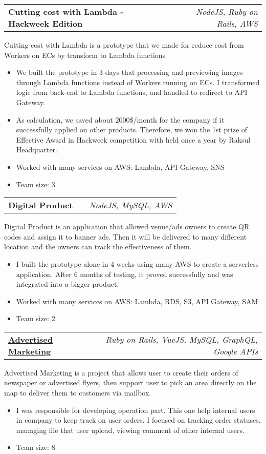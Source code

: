 \documentclass[a4paper,11pt]{article}
\makeatletter
\newcommand{\resumeItem}[1]{
  \item\small{#1}
}
\newcommand{\resumeItemListStart}{\begin{itemize}[rightmargin=0.11in]}
\newcommand{\resumeItemListEnd}{\end{itemize}}
\newcommand{\resumeTrioHeading}[3]{
  \item\small{
    \begin{tabular*}{0.96\textwidth}[t]{
      l@{\extracolsep{\fill}}c@{\extracolsep{\fill}}r
    }
      \textbf{#1} & \textit{#2} & \textit{#3}
      \smallskip
    \end{tabular*}
  }
}
\makeatother
\begin{document}
      \resumeTrioHeading{Cutting cost with Lambda - Hackweek Edition}{}{NodeJS, Ruby on Rails, AWS}
      \small{Cutting cost with Lambda is a prototype that we made for reduce cost from Workers on ECs by transform to Lambda functions}
        \resumeItemListStart{}    
          \resumeItem{We built the prototype in 3 days that processing and previewing images through Lambda functions instead of Workers running on ECs. I transformed logic from back-end to Lambda functions, and handled to redirect to API Gateway. }
          \resumeItem{As calculation, we saved about 2000\$/month for the company if it successfully applied on other products. Therefore, we won the 1st prize of Effective Award in Hackweek competition with held once a year by Raksul Headquarter.}
          \resumeItem{Worked with many services on AWS: Lambda, API Gateway, SNS}
          \resumeItem{Team size: 3}
        \resumeItemListEnd{}

      \resumeTrioHeading{Digital Product}{}{NodeJS, MySQL, AWS}
      \small{Digital Product is an application that allowed venue/ads owners to create QR codes and assign it to banner ads. Then it will be delivered to many different location and the owners can track the effectiveness of them.}
        \resumeItemListStart{}    
          \resumeItem{I built the prototype alone in 4 weeks using many AWS to create a serverless application. After 6 months of testing, it proved successfully and was integrated into a bigger product.}
          \resumeItem{Worked with many services on AWS: Lambda, RDS, S3, API Gateway, SAM}
          \resumeItem{Team size: 2}
        \resumeItemListEnd{}

      \resumeTrioHeading{\href{https://am.raksul.com/}{Advertised Marketing}}{}{Ruby on Rails, VueJS, MySQL, GraphQL, Google APIs}
      \small{Advertised Marketing is a project that allows user to create their orders of newspaper or advertised flyers, then support user to pick an area directly on the map to deliver them to customers via mailbox.}
        \resumeItemListStart{}    
          \resumeItem{I was responsible for developing operation part. This one help internal users in company to keep track on user orders. I focused on tracking order statuses, managing file that user upload, viewing comment of other internal users.}
          \resumeItem{Team size: 8}
        \resumeItemListEnd{}
\end{document}
